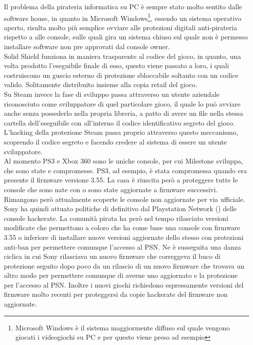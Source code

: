 Il problema della pirateria informatica su PC è sempre stato molto sentito dalle software house, in quanto in Microsoft Windows\footnote{Microsoft Windows è il sistema maggiormente diffuso sul quale vengono giocati i videogiochi su PC e per questo viene preso ad esempio}, essendo un sistema operativo aperto, risulta molto più semplice ovviare alle protezioni digitali anti-pirateria rispetto a alle console, sulle quali gira un sistema chiuso sul quale non è permesso installare software non pre approvati dal console owner.\\

Solid Shield funziona in maniera trasparente al codice del gioco, in quanto, una volta prodotto l'eseguibile finale di esso, questo viene passato a loro, i quali costruiscono un guscio esterno di protezione sbloccabile soltanto con un codice valido. Solitamente distribuito insieme alla copia retail del gioco.\\

Su Steam invece la fase di sviluppo passa attraverso un utente aziendale riconosciuto come sviluppatore di quel particolare gioco, il quale lo può avviare anche senza possederlo nella propria libreria, a patto di avere un file nella stessa cartella dell'eseguibile con all'interno il codice identificativo segreto del gioco. L'hacking della protezione Steam passa proprio attraverso questo meccanismo, scoprendo il codice segreto e facendo credere al sistema di essere un utente sviluppatore.\\

Al momento PS3\textsuperscript{\textregistered} e Xbox 360\textsuperscript{\textregistered} sono le uniche console, per cui Milestone sviluppa, che sono state  e compromesse.
PS3\textsuperscript{\textregistered}, ad esempio, è stata compromessa quando era presente il firmware versione 3.55. La casa è riuscita però a proteggere tutte le console che sono nate con o sono state aggiornate a firmware successivi. Rimangono però attualmente scoperte le console non aggiornate per via ufficiale. Sony ha quindi attuato politiche di  definitivo dal Playstation Network\textsuperscript{\textregistered} () delle console hackerate. La comunità pirata ha però nel tempo rilasciato versioni modificate che permettono a coloro che ha come base una console con firmware 3.55 o inferiore di installare nuove versioni aggiornate dello stesso con protezioni anti-ban per permettere comunque l'accesso al PSN\textsuperscript{\textregistered}. Ne è susseguita una danza ciclica in cui Sony rilasciava un nuovo firmware che correggeva il buco di protezione seguito dopo poco da un rilascio di un nuovo firmware che trovava un altro modo per permettere comunque di averne uno aggiornato e la protezione per l'accesso al PSN\textsuperscript{\textregistered}. Inoltre i nuovi giochi richiedono espressamente versioni del firmware molto recenti per proteggersi da copie hackerate del firmware non aggiornate.\\

